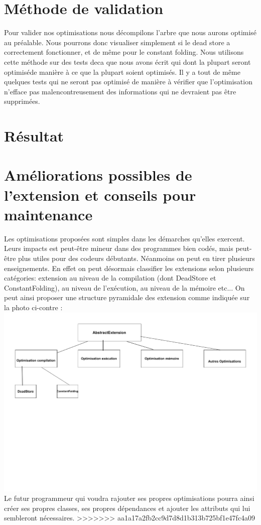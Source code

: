 \documentclass[a4paper]{article}
\begin{document}
\section{Méthode de validation}
Pour valider nos optimisations nous décompilons l'arbre que nous aurons optimisé au préalable. Nous pourrons donc visualiser simplement si le dead store a correctement fonctionner, et de même pour le constant folding. Nous utilisons cette méthode sur des tests deca que nous avons écrit qui dont la plupart seront optimiséde manière à ce que la plupart soient optimisés. Il y a tout de même quelques tests qui ne seront pas optimisé de manière à vérifier que l'optimisation n'efface pas malencontreusement des informations qui ne devraient pas être supprimées.
\section{Résultat}

\section{Améliorations possibles de l'extension et conseils pour maintenance}
Les optimisations proposées sont simples dans les démarches qu'elles exercent. Leurs impacts est peut-être mineur dans des programmes bien codés, mais peut-être plus utiles pour des codeurs débutants. Néanmoins on peut en tirer plusieurs enseignements.
En effet on peut désormais classifier les extensions selon plusieurs catégories: extension au niveau de la compilation (dont DeadStore et ConstantFolding), au niveau de l'exécution, au niveau de la mémoire etc...
On peut ainsi proposer une structure pyramidale des extension comme indiquée sur la photo ci-contre :\\
\includegraphics[scale=0.5]{UML.pdf}\\
Le futur programmeur qui voudra rajouter ses propres optimisations pourra ainsi créer ses propres classes, ses propres dépendances et ajouter les attributs qui lui sembleront nécessaires.
>>>>>>> aa1a17a2fb2cc9d7d8d1b313b725bf1e47fc4a09
\end{document}
